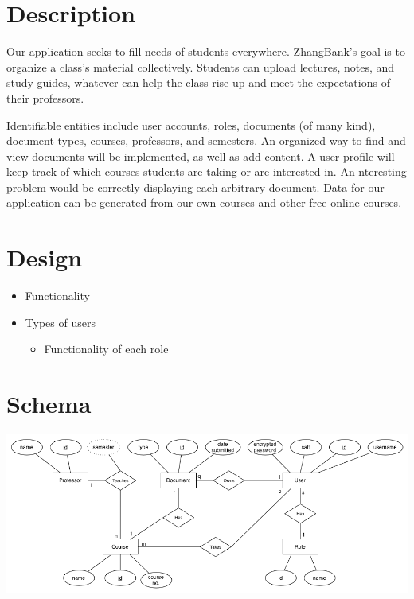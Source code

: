 \documentclass[11pt]{article}
\title{}
\author{}
\date{\today}
\begin{document}


\section*{Description}
\label{sec-1}


  Our application seeks to fill needs of students
  everywhere. ZhangBank's goal is to organize a class's material
  collectively. Students can upload lectures, notes, and study guides,
  whatever can help the class rise up and meet the expectations of
  their professors.

  Identifiable entities include user accounts, roles, documents (of
  many kind), document types, courses, professors, and semesters. An
  organized way to find and view documents will be implemented, as
  well as add content. A user profile will keep track of which courses
  students are taking or are interested in. An nteresting problem
  would be correctly displaying each arbitrary document. Data for our
  application can be generated from our own courses and other free
  online courses.
  
\section*{Design}
\label{sec-2}


\begin{itemize}
\item Functionality
\item Types of users
\begin{itemize}
\item Functionality of each role
\end{itemize}
\end{itemize}
\section*{Schema}
\label{sec-3}


  \includegraphics[width=.9\linewidth]{ER Diagram.png}
\end{document}
